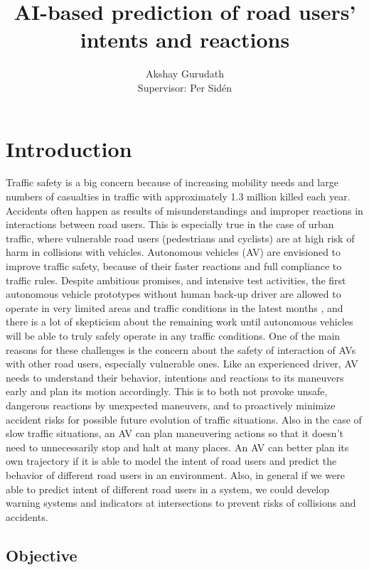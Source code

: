 \documentclass{article}
\title{AI-based prediction of road users’ intents and reactions}
\author{Akshay Gurudath\\[0.3cm]{\small Supervisor: Per Sidén}}
\begin{document}
\maketitle


\section{Introduction}
\justify{}

Traffic safety is a big concern because of increasing mobility needs and large numbers of casualties in traffic with approximately 1.3 million killed each year\cite{accidents}. Accidents often happen as results of misunderstandings and improper reactions in interactions between road users. This is especially true in the case of urban traffic, where vulnerable road users (pedestrians and
cyclists) are at high risk of harm in collisions with vehicles. Autonomous vehicles (AV) are envisioned to improve traffic safety, because of their faster reactions and full compliance to traffic rules. Despite ambitious promises, and intensive test activities, the first autonomous vehicle prototypes without human back-up driver are allowed to operate in very limited areas and traffic conditions in the latest months \cite{self_driving}, and there is a lot of skepticism about the remaining work until autonomous vehicles will be able to truly safely operate in any traffic conditions. One of the main reasons for these challenges is the concern about the safety of interaction of AVs with other road users, especially vulnerable ones. Like an experienced driver, AV needs to understand their behavior, intentions and reactions to its maneuvers early and plan its motion accordingly. This is to both not provoke unsafe, dangerous reactions by unexpected maneuvers, and to proactively minimize accident risks for possible future evolution of traffic situations. Also in the case of slow traffic situations, an AV can plan maneuvering actions so that it doesn't need to unnecessarily stop and halt at many places. An AV can better plan its own trajectory if it is able to model the intent of road users and predict the behavior of different road users in an environment. Also, in general if we were able to predict intent of different road users in a system, we could develop warning systems and indicators at intersections to prevent risks of collisions and accidents. 

\subsection{Objective}
\end{document}
